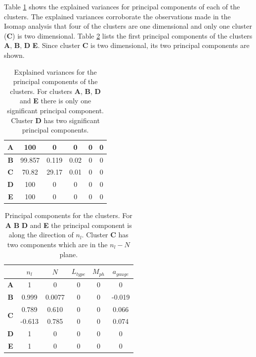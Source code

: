 Table \ref{clustersEV} shows the explained variances for principal
components of each of the clusters. The explained variances corroborate the
observations made in the Isomap analysis that four of the clusters are one
dimensional and only one cluster (\textbf{C}) is two dimensional. Table
\ref{clusterPC} lists the first principal components of the clusters
\textbf{A}, \textbf{B}, \textbf{D} \textbf{E}. Since cluster \textbf{C} is
two dimensional, its two principal components are shown.

\begin{table}[!ht]
  \centering
  \begin{tabular}{|c|c|c|c|c|c|}
    \hline
    \textbf{A} & 100 & 0 & 0 & 0 & 0 \\
    \hline
    \textbf{B} & 99.857 & 0.119 & 0.02 & 0 & 0\\
    \hline
    \textbf{C} & 70.82 & 29.17 & 0.01 & 0 & 0\\
    \hline
    \textbf{D} & 100 & 0 & 0 & 0 & 0\\
    \hline
    \textbf{E} & 100 & 0 & 0 & 0 & 0\\
    \hline
  \end{tabular}
  \caption{Explained variances for the principal components of the clusters. For clusters \textbf{A}, \textbf{B}, \textbf{D} and \textbf{E} there is only one significant principal component. Cluster \textbf{D} has two significant principal components.}
  \label{clustersEV}
\end{table}

\begin{table}[!ht]
  \centering
  \begin{tabular}{c|c|c|c|c|c|}
    
    \cline{2-6}
    & $n_l$ & $N$ & $ L_{type} $  & $ M_{ph}$ & $a_{gauge}$ \\
    \hline
    \multicolumn{1}{|c|}{\textbf{A}} & 1 & 0 & 0 & 0 & 0 \\
    \hline
    \multicolumn{1}{|c|}{\textbf{B}} & 0.999 & 0.0077 & 0 & 0 & -0.019\\
    \hline
    \multicolumn{1}{|c|}{\multirow{2}{*}{\textbf{C}}} & 0.789 & 0.610 & 0 & 0 & 0.066\\ \cline{2-6}
    \multicolumn{1}{|c|}{}& -0.613 & 0.785 & 0 & 0 & 0.074\\
    \hline
    \multicolumn{1}{|c|}{\textbf{D}} & 1 & 0 & 0 & 0 & 0\\
    \hline
    \multicolumn{1}{|c|}{\textbf{E}} & 1 & 0 & 0 & 0 & 0\\
    \hline
  \end{tabular}
  \caption{Principal components for the clusters. For \textbf{A} \textbf{B} \textbf{D} and \textbf{E} the principal component is along the direction of $n_l$. Cluster \textbf{C} has two components which are in the $n_l - N$ plane. }
  \label{clusterPC}
\end{table}

